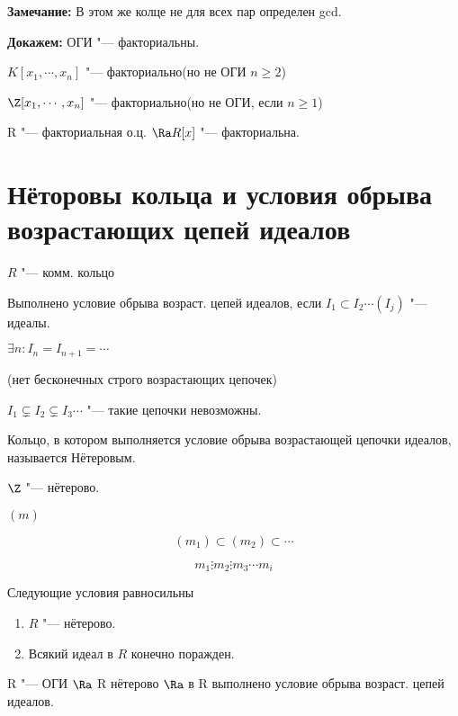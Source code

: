 \textbf{Замечание:} В этом же колце не для всех пар определен gcd.

\textbf{Докажем:} ОГИ "--- факториальны.

$K[x_1, \cdots, x_n]$ "--- факториально(но не ОГИ $n \ge 2$)

$\Z[x_1, \cdots, x_n]$ "--- факториально(но не ОГИ, если $n \ge 1$)

R "--- факториальная о.ц. $\Ra R[x]$ "--- факториальна.


\section{Нёторовы кольца и условия обрыва возрастающих цепей идеалов}

$R$ "--- комм. кольцо

Выполнено условие обрыва возраст. цепей идеалов, если $I_1 \subset I_2 \cdots (I_j)$ "--- идеалы.

$\exists n \colon I_n = I_{n + 1} = \cdots$

(нет бесконечных строго возрастающих цепочек)

$I_1 \subsetneq I_2 \subsetneq I_3 \cdots$ "--- такие цепочки невозможны. 

\begin{Def}
Кольцо, в котором выполняется условие обрыва возрастающей цепочки идеалов, называется Нётеровым.
\end{Def}

\begin{exmp}
$\Z$ "--- нётерово.

$(m)$

$$(m_1) \subset (m_2) \subset \cdots $$

$$m_1 \vdots m_2 \vdots m_3 \cdots m_i$$
\end{exmp}

\begin{theorem}{}
Следующие условия равносильны
\begin{enumerate}
    \item $R$ "--- нётерово.
    \item Всякий идеал в $R$ конечно поражден.
\end{enumerate}
\end{theorem}

\begin{conseq}
    R "--- ОГИ $\Ra$ R нётерово $\Ra$  в R выполнено условие обрыва возраст. цепей идеалов. 
\end{conseq}

